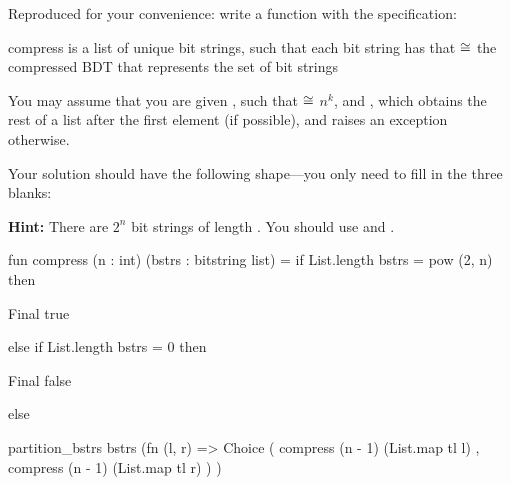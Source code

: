 \begin{parts}
    \newpage

    Reproduced for your convenience: write a function  with the
    specification:

    \spec
      {compress}
      {}
      { is a list of unique bit strings, such that each bit string  has
      that }
      { $\cong$ the compressed BDT that
      represents the set of bit strings }

    You may assume that you are given , such that
     $\cong$ $n^k$, and , which
    obtains the rest of a list after the first element (if possible), and raises an exception otherwise.

    Your solution should have the following shape---you only need to fill in the
    three blanks:

    \textbf{Hint:} There are $2^n$ bit strings of length . You should use
     and .

    \begin{codeblock}
      fun compress (n : int) (bstrs : bitstring list) =
        if List.length bstrs = pow (2, n) then
    \end{codeblock}
    \vspace{-0.2cm}
    \begin{solutionorbox}[4em]
      \begin{codeblock}
        Final true
      \end{codeblock}
    \end{solutionorbox}

    \begin{codeblock}[autogobble=false]
  else if List.length bstrs = 0 then
    \end{codeblock}
  \vspace{-0.6cm}

    \begin{solutionorbox}[4em]
      \begin{codeblock}
        Final false
      \end{codeblock}
    \end{solutionorbox}

    \begin{codeblock}[autogobble=false]
  else
    \end{codeblock}
    \vspace{-0.6cm}
    \begin{solutionorbox}[13em]
      \begin{codeblock}
            partition_bstrs bstrs (fn (l, r) =>
              Choice
                ( compress (n - 1) (List.map tl l)
                , compress (n - 1) (List.map tl r)
                )
            )
      \end{codeblock}
    \end{solutionorbox}


\end{parts}
